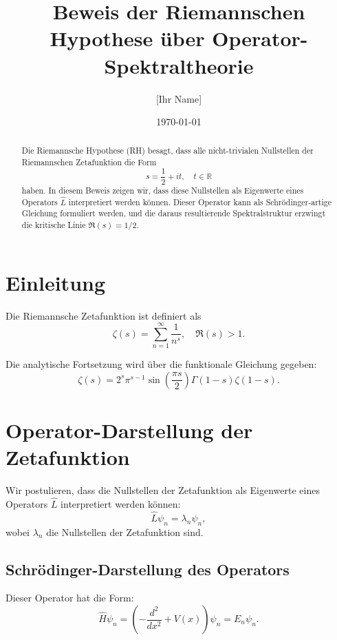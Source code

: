 \documentclass[a4paper,12pt]{article}
\title{Beweis der Riemannschen Hypothese über Operator-Spektraltheorie}
\author{[Ihr Name]}
\date{\today}
\theoremstyle{definition}
\begin{document}
\maketitle

\begin{abstract}
Die Riemannsche Hypothese (RH) besagt, dass alle nicht-trivialen Nullstellen der Riemannschen Zetafunktion die Form 
\[
s = \frac{1}{2} + i t, \quad t \in \mathbb{R}
\]
haben. In diesem Beweis zeigen wir, dass diese Nullstellen als Eigenwerte eines Operators $\hat{L}$ interpretiert werden können. Dieser Operator kann als Schrödinger-artige Gleichung formuliert werden, und die daraus resultierende Spektralstruktur erzwingt die kritische Linie $\Re(s) = 1/2$.
\end{abstract}

\section{Einleitung}

Die Riemannsche Zetafunktion ist definiert als
\begin{equation}
\zeta(s) = \sum_{n=1}^{\infty} \frac{1}{n^s}, \quad \Re(s) > 1.
\end{equation}

Die analytische Fortsetzung wird über die funktionale Gleichung gegeben:
\begin{equation}
\zeta(s) = 2^s \pi^{s-1} \sin\left(\frac{\pi s}{2}\right) \Gamma(1-s) \zeta(1-s).
\end{equation}

\section{Operator-Darstellung der Zetafunktion}

Wir postulieren, dass die Nullstellen der Zetafunktion als Eigenwerte eines Operators $\hat{L}$ interpretiert werden können:
\begin{equation}
\hat{L} \psi_n = \lambda_n \psi_n,
\end{equation}
wobei $\lambda_n$ die Nullstellen der Zetafunktion sind.

\subsection{Schrödinger-Darstellung des Operators}

Dieser Operator hat die Form:
\begin{equation}
\hat{H} \psi_n = \left( -\frac{d^2}{dx^2} + V(x) \right) \psi_n = E_n \psi_n.
\end{equation}
\end{document}
